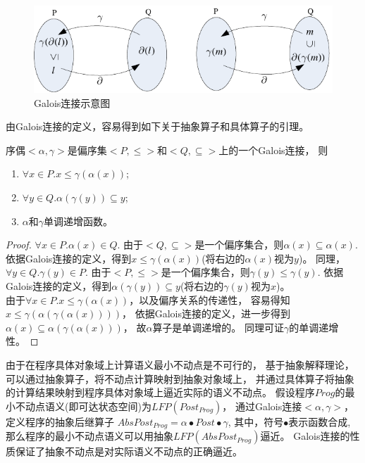 \begin{figure}[h]
\centering
\includegraphics{figures/chap04/galois.pdf}
\caption{Galois连接示意图}
\label{fig-galois}
\end{figure}

由Galois连接的定义，容易得到如下关于抽象算子和具体算子的引理。

\begin{lemma}
序偶$<\alpha, \gamma>$是偏序集$<P, \leq>$和$<Q, \subseteq>$上的一个Galois连接， 则
\begin{enumerate}
\item $\forall x\in P. x \leq \gamma(\alpha(x))$;
\item $\forall y\in Q. \alpha(\gamma(y)) \subseteq y$;
\item $\alpha$和$\gamma$单调递增函数。
\end{enumerate}
\end{lemma}
	
\begin{proof}
$\forall x\in P. \alpha(x) \in Q$. 
由于$<Q, \subseteq>$是一个偏序集合，则$\alpha(x) \subseteq \alpha(x)$.
依据Galois连接的定义，得到$ x \leq \gamma(\alpha(x))$(将右边的$\alpha(x)$视为$y$)。
同理，$\forall y \in Q. \gamma(y) \in P$.
由于$<P, \leq>$是一个偏序集合，则$\gamma(y) \leq \gamma(y)$.
依据Galois连接的定义，得到$\alpha(\gamma(y)) \subseteq y$(将右边的$\gamma(y)$视为$x$)。\\
由于$\forall x\in P. x\leq \gamma(\alpha(x))$，以及偏序关系的传递性，
容易得知$ x\leq \gamma(\alpha(\gamma(\alpha(x))))$，
依据Galois连接的定义，进一步得到$\alpha(x)\subseteq \alpha(\gamma(\alpha(x)))$，
故$\alpha$算子是单调递增的。
同理可证$\gamma$的单调递增性。
\end{proof}


由于在程序具体对象域上计算语义最小不动点是不可行的，
基于抽象解释理论，可以通过抽象算子，将不动点计算映射到抽象对象域上，
并通过具体算子将抽象的计算结果映射到程序具体对象域上逼近实际的语义不动点。
假设程序$Prog$的最小不动点语义(即可达状态空间)为$LFP(Post_{Prog})$，
通过Galois连接$<\alpha, \gamma>$，定义程序的抽象后继算子
$AbsPost_{Prog} = \alpha \bullet Post \bullet \gamma$,
其中，符号$\bullet$表示函数合成,
那么程序的最小不动点语义可以用抽象$LFP(AbsPost_{Prog})$逼近。
Galois连接的性质保证了抽象不动点是对实际语义不动点的正确逼近。

